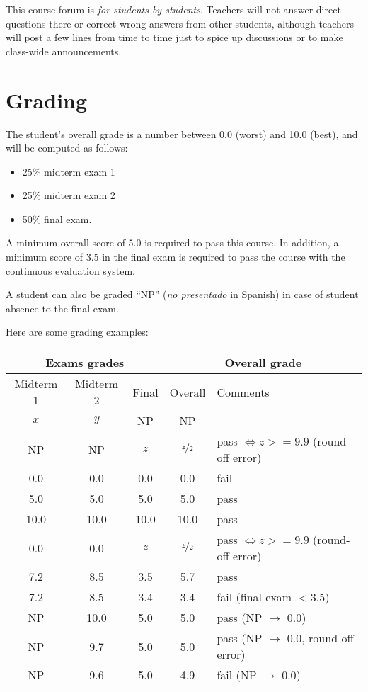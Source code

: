 \documentclass[11pt, a4paper, twoside]{article}
\begin{document}
This course forum is \emph{for students by students}. Teachers will not answer
direct questions there or correct wrong answers from other students, although
teachers will post a few lines from time to time just to spice up discussions
or to make class-wide announcements.


\section{Grading}

The student's overall grade is a number between 0.0 (worst) and 10.0 (best),
and will be computed as follows:

\begin{itemize}

  \item 25\% midterm exam 1

  \item 25\% midterm exam 2

  \item 50\% final exam.

\end{itemize}

A minimum overall score of 5.0 is required to pass this course. In addition,
a minimum score of 3.5 in the final exam is required to pass
the course with the continuous evaluation system.

A student can also be graded ``NP'' (\emph{no presentado} in Spanish) in case
of student absence to the final exam.

Here are some grading examples:

\begin{center}
  \begin{tabular}{|c|c|c||c|l|}
    \hline
    \multicolumn{3}{|c||}{Exams grades} & \multicolumn{2}{|c|}{Overall grade} \\
    \hline
    Midterm 1 & Midterm 2 & Final & Overall & Comments\\
    \hline
    $x$  & $y$  & NP   & NP   & \\
    NP   & NP   & $z$  & $\nicefrac{z}{2}$  & pass $\iff z >= 9.9$ (round-off error)\\
    \hline
    0.0  & 0.0  & 0.0  & 0.0  & fail \\
    5.0  & 5.0  & 5.0  & 5.0  & pass \\
    10.0 & 10.0 & 10.0 & 10.0 & pass \\
    \hline
    0.0  & 0.0  & $z$ & $\nicefrac{z}{2}$ & pass $\iff z >= 9.9$ (round-off error)\\
    \hline
    7.2  & 8.5  & 3.5  & 5.7  & pass \\
    7.2  & 8.5  & 3.4  & 3.4  & fail (final exam $< 3.5$) \\
    \hline
    NP   & 10.0 & 5.0  & 5.0  & pass (NP $\rightarrow$ 0.0) \\
    NP   & 9.7  & 5.0  & 5.0  & pass (NP $\rightarrow$ 0.0, round-off error) \\
    NP   & 9.6  & 5.0  & 4.9  & fail (NP $\rightarrow$ 0.0) \\
    \hline
  \end{tabular}
\end{center}
\end{document}
